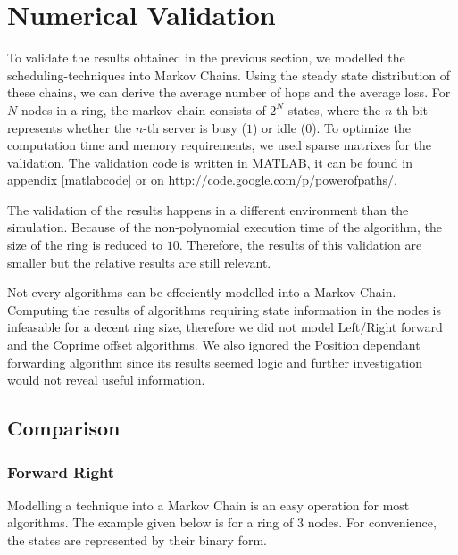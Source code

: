 \documentclass[10pt,a4paper]{article}
\begin{document}
\section{Numerical Validation}
\label{secvalidation}

To validate the results obtained in the previous section, we modelled the scheduling-techniques into Markov Chains. Using the steady state distribution of these chains, we can derive the average number of hops and the average loss.
For $N$ nodes in a ring, the markov chain consists of $2^N$ states, where the $n$-th bit represents whether the $n$-th server is busy ($1$) or idle ($0$). To optimize the computation time and memory requirements, we used sparse matrixes for the validation. The validation code is written in MATLAB, it can be found in appendix \ref{matlabcode} or on \url{http://code.google.com/p/powerofpaths/}.

The validation of the results happens in a different environment than the simulation. Because of the non-polynomial execution time of the algorithm, the size of the ring is reduced to $10$. Therefore, the results of this validation are smaller but the relative results are still relevant.

Not every algorithms can be effeciently modelled into a Markov Chain. Computing the results of algorithms requiring state information in the nodes is infeasable for a decent ring size, therefore we did not model Left/Right forward and the Coprime offset algorithms. We also ignored the Position dependant forwarding algorithm since its results seemed logic and further investigation would not reveal useful information.

\subsection{Comparison}
\subsubsection*{Forward Right}
Modelling a technique into a Markov Chain is an easy operation for most algorithms. The example given below is for a ring of 3 nodes. For convenience, the states are represented by their binary form.
\end{document}

